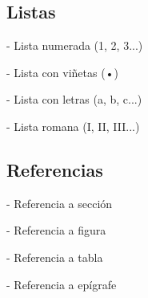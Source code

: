 \documentclass{template_pid}
\begin{document}
\subsection{Listas}
\begin{listapuntos}
    \item {} - Lista numerada (1, 2, 3...)
    \item {} - Lista con viñetas (•)
    \item {} - Lista con letras (a, b, c...)
    \item {} - Lista romana (I, II, III...)
\end{listapuntos}

\subsection{Referencias}
\begin{listapuntos}
    \item {} - Referencia a sección
    \item {} - Referencia a figura
    \item {} - Referencia a tabla
    \item {} - Referencia a epígrafe
\end{listapuntos}
\end{document}

